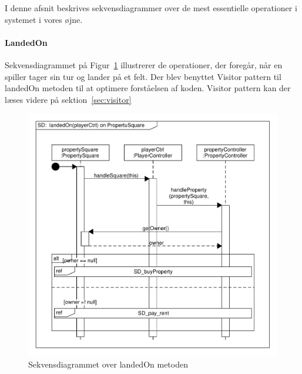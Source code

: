\documentclass[class=article, crop=false]{standalone}
\begin{document}
    I denne afsnit beskrives sekvensdiagrammer over de mest essentielle operationer i systemet i vores øjne.
    \paragraph{LandedOn\\}
Sekvensdiagrammet på Figur~\ref{fig:SD_landed_on} illustrerer de operationer, der foregår, når en spiller tager sin tur og lander på et felt. Der blev benyttet Visitor pattern til landedOn metoden til at optimere forståelsen af koden. Visitor pattern kan der læses videre på sektion~\ref{sec:visitor}
    \begin{figure}[H]

\hbox{\hspace{-0cm}\includegraphics[scale=0.7]{diagrams/SD_landed_on.pdf}}

        \caption{Sekvensdiagrammet over landedOn metoden}\label{fig:SD_landed_on}
    \end{figure}
    \newpage
\end{document}
